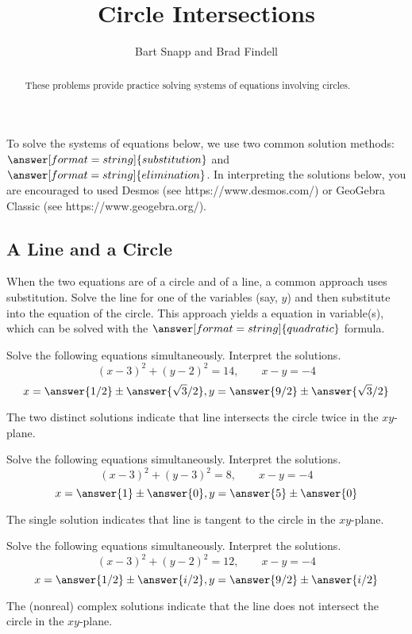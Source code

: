 \documentclass[space,handout,nooutcomes]{ximera}
\title{Circle Intersections}
\author{Bart Snapp and Brad Findell}
\begin{document}
\begin{abstract}
These problems provide practice solving systems of equations involving circles. 
\end{abstract}
\maketitle

To solve the systems of equations below, we use two common solution methods: $\answer[format=string]{substitution}$ and $\answer[format=string]{elimination}$.  In interpreting the solutions below, you are encouraged to used Desmos (see https://www.desmos.com/) or GeoGebra Classic (see https://www.geogebra.org/).  

\subsection{A Line and a Circle}
When the two equations are of a circle and of a line, a common approach uses substitution.  Solve the line for one of the variables (say, $y$) and then substitute into the equation of the circle.  This approach yields a  equation in  variable(s), which can be solved with the $\answer[format=string]{quadratic}$ formula.  

\begin{problem}
Solve the following equations simultaneously.  Interpret the solutions.  
\[
(x-3)^2+(y-2)^2 = 14, \qquad  x - y = -4
\]
\[
x  = \answer{1/2} \pm \answer{\sqrt{3}/2}, y = \answer{9/2} \pm \answer{\sqrt{3}/2}
\]
\begin{hint}
The two distinct solutions indicate that line intersects the circle twice in the $xy$-plane.  
\end{hint}
\end{problem}


\begin{problem}
Solve the following equations simultaneously.  Interpret the solutions.  
\[
(x-3)^2+(y-3)^2 = 8, \qquad x - y = -4
\]
\[
x  = \answer{1} \pm \answer{0}, y = \answer{5} \pm \answer{0}
\]
\begin{hint}
The single solution indicates that line is tangent to the circle in the $xy$-plane.  
\end{hint}
\end{problem}


\begin{problem}
Solve the following equations simultaneously.  Interpret the solutions.  
\[
(x-3)^2+(y-2)^2 = 12, \qquad x - y = -4
\]
\[
x  = \answer{1/2} \pm \answer{i/2}, y = \answer{9/2} \pm \answer{i/2}
\]
\begin{hint}
The (nonreal) complex solutions indicate that the line does not intersect the circle in the $xy$-plane.  
\end{hint}
\end{problem}
\end{document}
